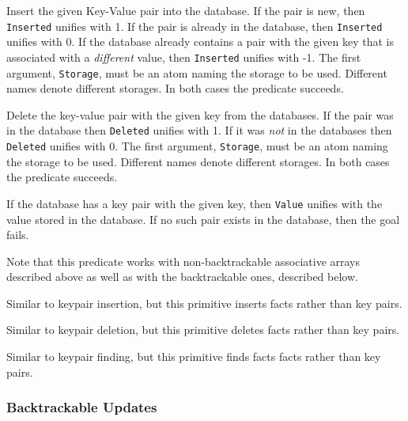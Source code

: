 \begin{description}
Insert the given Key-Value pair into the database. If the pair is new, then
{\tt Inserted} unifies with 1. If the pair is already in the database, then
{\tt Inserted} unifies with 0. If the database already contains a pair with
the given key that is associated with a \emph{different} value, then
{\tt Inserted} unifies with -1.
The first argument, {\tt Storage}, must be an atom naming the storage to be
used. Different names denote different storages.
In both cases the predicate succeeds.

Delete the key-value pair with the given key from the databases. If
the pair was in the database then {\tt Deleted} unifies with 1.
If it was \emph{not} in the databases then {\tt Deleted} unifies with 0.
The first argument, {\tt Storage}, must be an atom naming the storage to be
used. Different names denote different storages.
In both cases the predicate succeeds.

If the database has a key pair with the given key, then {\tt Value} unifies
with the value stored in the database. If no such pair exists in the
database, then the goal fails.

Note that this predicate works with non-backtrackable associative arrays
described above as well as with the backtrackable ones, described below.

Similar to keypair insertion, but this primitive inserts facts rather than
key pairs.

Similar to keypair deletion, but this primitive deletes facts rather than
key pairs.

Similar to keypair finding, but this primitive finds facts facts rather than
key pairs.
\end{description}

\subsubsection{Backtrackable Updates}
\label{backtrackable update}

